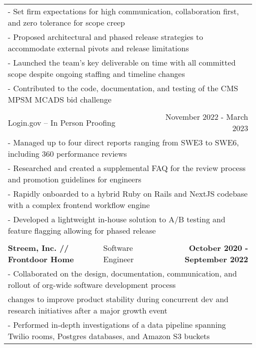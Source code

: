 \documentclass[letterpaper]{article}
\begin{document}
\begin{center}
\begin{tabular}{p{}p{}r}
			  \multicolumn{3}{p{\textwidth}}{\quad\quad - Set firm expectations for high communication, collaboration first, and zero tolerance for scope creep} \\
			  \multicolumn{3}{p{\textwidth}}{\quad\quad - Proposed architectural and phased release strategies to accommodate external pivots and release limitations} \\
			  \multicolumn{3}{p{\textwidth}}{\quad\quad - Launched the team's key deliverable on time with all committed scope despite ongoing staffing and timeline changes} \\
			  \multicolumn{3}{p{\textwidth}}{\quad\quad - Contributed to the code, documentation, and testing of the CMS MPSM MCADS bid challenge } 

		  \\
		  \\
			  \multicolumn{2}{p{0.5\textwidth}}{\quad Login.gov -- In Person Proofing}
			  &
			  {November 2022 - March 2023 \quad\quad\quad\quad}
		  \\
			  \multicolumn{3}{p{\textwidth}}{\quad\quad - Managed up to four direct reports ranging from SWE3 to SWE6, including 360 performance reviews} \\
			  \multicolumn{3}{p{\textwidth}}{\quad\quad - Researched and created a supplemental FAQ for the review process and promotion guidelines for engineers} \\
			  \multicolumn{3}{p{\textwidth}}{\quad\quad - Rapidly onboarded to a hybrid Ruby on Rails and NextJS codebase with a complex frontend workflow engine} \\
			  \multicolumn{3}{p{\textwidth}}{\quad\quad - Developed a lightweight in-house solution to A/B testing and feature flagging allowing for phased release}
		  \\
		  \\
				\textbf{Streem, Inc. // Frontdoor Home} &
				\quad\quad\quad\quad\quad\quad Software Engineer &
				\textbf{October 2020 - September 2022\quad}
			\\
				\multicolumn{3}{p{\textwidth}}{\quad\quad - Collaborated on the design, documentation, communication, and rollout of org-wide software development process}
			\\
				\multicolumn{3}{p{\textwidth}}{\quad\quad\quad changes to improve product stability during concurrent dev and research initiatives after a major growth event} 
			\\
				\multicolumn{3}{p{\textwidth}}{\quad\quad - Performed in-depth investigations of a data pipeline spanning Twilio rooms, Postgres databases, and Amazon S3 buckets}  

\end{tabular}
\end{center}
\end{document}
